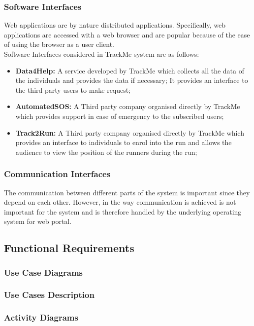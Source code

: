 \documentclass[12pt]{article}
\begin{document}
\subsubsection{Software Interfaces}
Web applications are by nature distributed applications. Specifically, web applications are accessed with a web browser and are popular because of the ease of using the browser as a user client.\\
Software Interfaces considered in TrackMe system are as follows:
\begin{itemize}
\item{} \textbf{Data4Help:} A service developed by TrackMe which collects all the data of the individuals and provides the data if necessary; It provides an interface to the third party users to make request;
\item{} \textbf{AutomatedSOS:} A Third party company organised directly by TrackMe which provides support in case of emergency to the subscribed users;
\item{} \textbf{Track2Run:} A Third party company organised directly by TrackMe which provides an interface to individuals to enrol into the run and allows the audience to view the position of the runners during the run;
\end{itemize}
\subsubsection{Communication Interfaces}
The communication between different parts of the system is important since they depend on each other. However, in the way communication is achieved is not important for the system and is therefore handled by the underlying operating system for web portal.
\subsection{Functional Requirements}
\subsubsection{Use Case Diagrams}

\subsubsection{Use Cases Description}

\subsubsection{Activity Diagrams}
\end{document}
